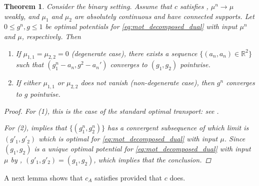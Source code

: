 \documentclass{amsart}
\theoremstyle{plain}
\numberwithin{equation}{section}\newtheorem{theorem}{Theorem}[section]
\theoremstyle{remark}
\begin{document}
\begin{theorem}\label{thm: pointwise limit of g}
Consider the binary setting. Assume that $c$ satisfies , $\mu^n \to \mu$ weakly, and $\mu_1$ and $\mu_2$ are absolutely continuous and have connected supports. Let $0 \leq g^n, g \leq 1$ be optimal potentials for \eqref{eq:mot_decomposed_dual} with input $\mu^n$ and $\mu$, respectively. Then
\begin{enumerate}
    \item If $\mu_{1,1}=\mu_{2,2}=0$ (degenerate case), there exists a sequence $\{(a_n,a
    _n) \in \mathbb{R}^2\}$ such that $(g^n_1-a_n, g^2 -a_n')$ converges to $(g_1,g_2)$ pointwise.
    \item If either $\mu_{1,1}$ or $\mu_{2,2}$ does not vanish (non-degenerate case), then $g^n$ converges to $g$ pointwise.
\end{enumerate}






\begin{proof}
For (1), this is the case of the standard optimal transport: see \cite[Theorem 3.4]{CLT_general_transport2024}.


For (2),  implies that $\{(g^n_1, g^n_2)\}$ has a convergent subsequence of which limit is $(g'_1, g'_2)$ which is optimal for \eqref{eq:mot_decomposed_dual} with input $\mu$. Since $(g_1, g_2)$ is a unique optimal potential for \eqref{eq:mot_decomposed_dual} with input $\mu$ by , $(g'_1, g'_2)=(g_1, g_2)$, which implies that the conclusion.
\end{proof}
\end{theorem}



A next lemma shows that $c_A$ satisfies  provided that $c$ does.
\end{document}
